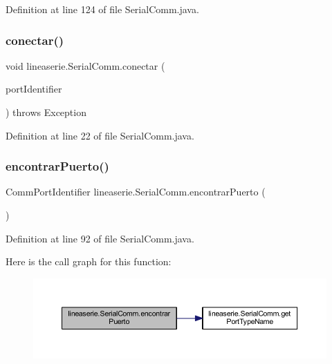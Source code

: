 Definition at line 124 of file Serial\+Comm.\+java.

\mbox{\label{classlineaserie_1_1_serial_comm_a877035aa389c7d3ceef75f1927afd4d5}} 
\subsubsection{\texorpdfstring{conectar()}{conectar()}}
{\footnotesize\ttfamily void lineaserie.\+Serial\+Comm.\+conectar (\begin{DoxyParamCaption}\item[{Comm\+Port\+Identifier}]{port\+Identifier }\end{DoxyParamCaption}) throws Exception}



Definition at line 22 of file Serial\+Comm.\+java.

\mbox{\label{classlineaserie_1_1_serial_comm_ac940f6b749e1137f5f1233b320e0e46f}} 
\subsubsection{\texorpdfstring{encontrar\+Puerto()}{encontrarPuerto()}}
{\footnotesize\ttfamily Comm\+Port\+Identifier lineaserie.\+Serial\+Comm.\+encontrar\+Puerto (\begin{DoxyParamCaption}{ }\end{DoxyParamCaption})}



Definition at line 92 of file Serial\+Comm.\+java.

Here is the call graph for this function\+:
\nopagebreak
\begin{figure}[H]
\begin{center}
\leavevmode
\includegraphics[width=350pt]{classlineaserie_1_1_serial_comm_ac940f6b749e1137f5f1233b320e0e46f_cgraph}
\end{center}
\end{figure}
\mbox{\label{classlineaserie_1_1_serial_comm_aafba8fce6137b4b5a5e7795f07fef02c}} 
